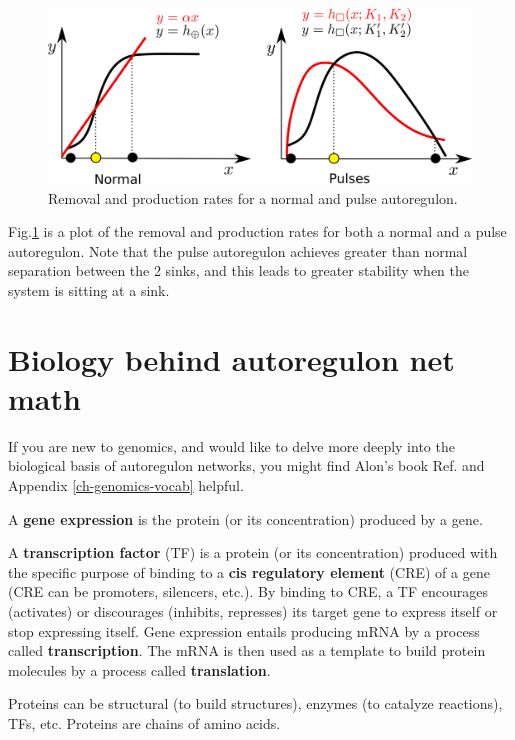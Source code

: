 \begin{figure}[h!]
\centering
\includegraphics[width=4.7in]
{autoregulons/pulse-removal-production.png}
\caption{Removal and production rates for
a normal and pulse autoregulon.}
\label{fig-pulse-removal-production}
\end{figure}
Fig.\ref{fig-pulse-removal-production}
is a plot of the removal and production rates for both
a normal and a pulse autoregulon. Note
that the pulse autoregulon
achieves greater
than normal separation
between the 2 sinks, 
and this leads to greater stability 
when the system is sitting at a sink.



\section{Biology behind autoregulon net math}
\label{sec-bio-basis-ar}

If you are new to genomics, and would like to delve more deeply into the biological
basis of autoregulon networks, you might find
Alon's book Ref.\cite{alon-book} and Appendix \ref{ch-genomics-vocab} helpful.


A {\bf gene expression} is the protein (or its concentration) produced by a gene.

A {\bf transcription factor} (TF) is a protein (or its concentration) produced with the
specific purpose of binding to a {\bf cis regulatory element} (CRE) of a gene (CRE can be promoters, silencers, etc.). By binding to CRE, a TF
encourages (activates) or discourages (inhibits, represses) its target gene to express itself
or stop expressing itself. Gene expression entails producing mRNA by a process called {\bf transcription}. The mRNA is then used as a template to build protein molecules by a process called {\bf translation}. 

Proteins can be structural (to build structures), enzymes (to catalyze reactions), TFs, etc. Proteins
are chains of amino acids.


